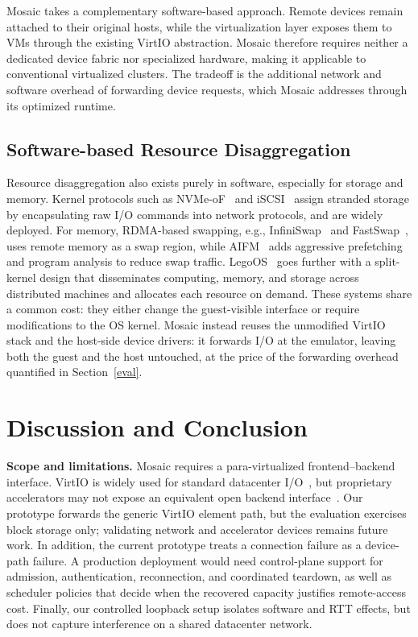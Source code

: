 \documentclass[sigplan,10pt]{acmart}
\begin{document}
Mosaic takes a complementary software-based approach. Remote devices remain attached to their original hosts, while the virtualization layer exposes them to VMs through the existing VirtIO abstraction. Mosaic therefore requires neither a dedicated device fabric nor specialized hardware, making it applicable to conventional virtualized clusters. The tradeoff is the additional network and software overhead of forwarding device requests, which Mosaic addresses through its optimized runtime.

\subsection{Software-based Resource Disaggregation}
Resource disaggregation also exists purely in software, especially for storage and memory. Kernel protocols such as NVMe-oF~\cite{nvmeof} and iSCSI~\cite{iscsi} assign stranded storage by encapsulating raw I/O commands into network protocols, and are widely deployed. For memory, RDMA-based swapping, e.g., InfiniSwap~\cite{infiniswap} and FastSwap~\cite{fastswap}, uses remote memory as a swap region, while AIFM~\cite{aifm} adds aggressive prefetching and program analysis to reduce swap traffic. LegoOS~\cite{legoos} goes further with a split-kernel design that disseminates computing, memory, and storage across distributed machines and allocates each resource on demand. These systems share a common cost: they either change the guest-visible interface or require modifications to the OS kernel. Mosaic instead reuses the unmodified VirtIO stack and the host-side device drivers: it forwards I/O at the emulator, leaving both the guest and the host untouched, at the price of the forwarding overhead quantified in Section~\ref{eval}.

\section{Discussion and Conclusion}\label{conclu}
\noindent\textbf{Scope and limitations.} Mosaic requires a para-virtualized frontend--backend interface. VirtIO is widely used for standard datacenter I/O~\cite{virtio}, but proprietary accelerators may not expose an equivalent open backend interface~\cite{nvidia, google, ascend}. Our prototype forwards the generic VirtIO element path, but the evaluation exercises block storage only; validating network and accelerator devices remains future work. In addition, the current prototype treats a connection failure as a device-path failure. A production deployment would need control-plane support for admission, authentication, reconnection, and coordinated teardown, as well as scheduler policies that decide when the recovered capacity justifies remote-access cost. Finally, our controlled loopback setup isolates software and RTT effects, but does not capture interference on a shared datacenter network.
\end{document}
